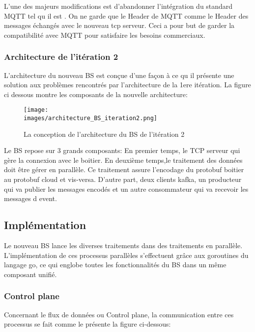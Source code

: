         L’une des majeurs modifications est d'abandonner l’intégration du standard MQTT 
        tel qu il est . On ne garde que le Header de MQTT comme le Header des messages 
        échangés avec le nouveau tcp serveur. Ceci a pour but de garder la compatibilité 
        avec MQTT pour satisfaire les besoins commerciaux. 

        \subsubsection{Architecture de l'itération 2 }
            L’architecture du nouveau BS est conçue d’une façon à ce qu il présente 
            une solution aux problèmes rencontrés par l’architecture de la 1ere itération. 
            La figure ci dessous montre les composants de la nouvelle architecture:  \\
            \begin{figure}[ht]
                \centering
                \texttt{[image: \\images/architecture\_BS\_iteration2.png]}
                \caption{La conception de l'architecture du BS de l'itération 2}
                \label{Figure }
            \end{figure}
        
       
            Le BS  repose sur 3 grands composants: 
            En premier temps, le TCP serveur qui gère la connexion avec le boitier. 
            En deuxième temps,le traitement des données doit être gérer en parallèle. 
            Ce traitement assure l’encodage du protobuf boitier au protobuf cloud et 
            vis-versa. 
            D’autre part, deux clients kafka, un producteur qui va publier les messages 
            encodés et un autre consommateur qui va recevoir les messages d event. 

            \subsection{Implémentation}
            Le nouveau BS lance les diverses traitements dans des traitements en 
            parallèle. L’implémentation de ces processus parallèles s’effectuent grâce 
            aux goroutines du langage go, ce qui englobe toutes les fonctionnalités du BS 
            dans un même composant unifié.

            \subsubsection{Control plane}
             Concernant le flux de données ou Control plane, la communication entre 
             ces processus se fait comme le présente la figure ci-dessous: \\

